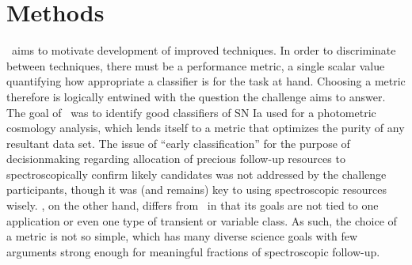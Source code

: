 \section{Methods}
\label{sec:methods}


\plasticc\ aims to motivate development of improved techniques.
In order to discriminate between techniques, there must be a performance metric, a single scalar value quantifying how appropriate a classifier is for the task at hand.
Choosing a metric therefore is logically entwined with the question the challenge aims to answer.
The goal of \snphotcc\ was to identify good classifiers of SN Ia used for a photometric cosmology analysis, which lends itself to a metric that optimizes the purity of any resultant data set.
The issue of ``early classification'' for the purpose of decisionmaking regarding allocation of precious follow-up resources to spectroscopically confirm likely candidates was not addressed by the challenge participants, though it was (and remains) key to using spectroscopic resources wisely.
\plasticc, on the other hand, differs from \snphotcc\ in that its goals are not tied to one application or even one type of transient or variable class.
As such, the choice of a metric is not so simple, which has many diverse science goals with few arguments strong enough for meaningful fractions of spectroscopic follow-up.

